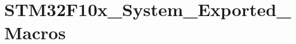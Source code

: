 \hypertarget{group___s_t_m32_f10x___system___exported___macros}{\section{S\-T\-M32\-F10x\-\_\-\-System\-\_\-\-Exported\-\_\-\-Macros}
\label{group___s_t_m32_f10x___system___exported___macros}
}
